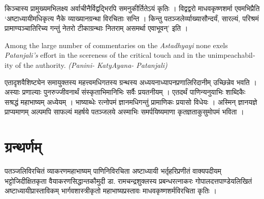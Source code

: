 किञ्चास्य प्रामुख्यमभिलक्ष्य अर्वाचीनैर्विद्वद्भिरपि समनुकीर्तितेऽयं कृतिः । विद्वद्वरो माधवकृष्णशर्मा एवमभिप्रैति ‘अष्टाध्यायीमधिकृत्य नैके व्याख्यानग्रन्था विरचिताः सन्ति । किन्तु पतञ्जलेर्व्याख्यासौन्दर्यं, सारल्यं, परिश्रमं प्रामाण्यञ्चातिरिच्य गन्तुं नेतरो टीकाग्रन्थाः नितराम् असमर्था एवाभूवन्’ इति ।

\begin{english}
Among the large number of commentaries on the \textit{Astadhyayi} none exels \textit{Patanjali’s} effort in the scereness of the critical touch and in the unimpeachability of the authority. \textit{(Panini- KatyAyana- Patanjali)}
\end{english}

एतादृशवैशिष्ट्येन समायुक्तस्य महत्त्वमधिगतस्य ग्रन्थस्य अध्ययनाध्यापनप्रणालिरिदानीम् उच्छिन्नेव भवति । अस्याः प्रणाल्याः पुनरुज्जीवनार्थं संस्कृताभिमानिभिः सर्वैः प्रयतनीयम् । एतदर्थं पाणिन्यनुयाभिः शाब्दिकैः सश्रद्धं महाभाष्यम् अध्येयम् । भाष्याब्धेः रत्नोपमं ज्ञानमधिगन्तुं प्रामाणिकः प्रयासो विधेयः । अस्मिन् ज्ञानयज्ञे प्राप्यमाणम् अल्पमपि साफल्यं महर्षये पतञ्जलये अस्माभिः समर्पयिष्यमाणा कृतज्ञताकुसुमोपमं भविता ।

\section*{ग्रन्थर्णम्}

\begin{thebibliography}{99}
 पतञ्जलिविरचितं व्याकरणमहाभाष्यम्
 पाणिनिविरचिता अष्टाध्यायी
 भर्तृहरिप्रणीतं वाक्यपदीयम्
 भट्टोजिदीक्षितकृता वैयाकरणसिद्धान्तकौमुदी
 डा. रामचन्द्रशुक्लस्य प्रबन्धरत्नाकरः
 गोपालदत्तपाण्डेयलिखितं अष्टाध्यायीप्रास्ताविकम्
 भार्गवशास्त्रीकृतो महाभाष्यप्रस्तावः
 माधवकृष्णशर्मविरचिता  कृतिः ।
\end{thebibliography}

\articleend
